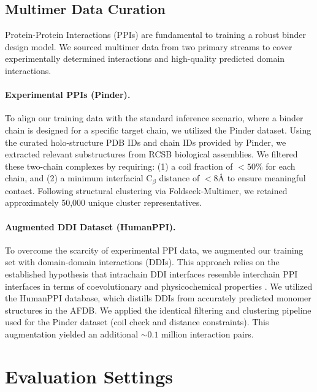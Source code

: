\subsection{Multimer Data Curation}
Protein-Protein Interactions (PPIs) are fundamental to training a robust binder design model. We sourced multimer data from two primary streams to cover experimentally determined interactions and high-quality predicted domain interactions.

\paragraph{Experimental PPIs (Pinder).} 
To align our training data with the standard inference scenario, where a binder chain is designed for a specific target chain, we utilized the Pinder dataset. Using the curated holo-structure PDB IDs and chain IDs provided by Pinder, we extracted relevant substructures from RCSB biological assemblies. We filtered these two-chain complexes by requiring: (1) a coil fraction of $< 50\%$ for each chain, and (2) a minimum interfacial C$_\beta$ distance of $< 8\text{\AA}$ to ensure meaningful contact. Following structural clustering via Foldseek-Multimer, we retained approximately 50,000 unique cluster representatives.

\paragraph{Augmented DDI Dataset (HumanPPI).} 
To overcome the scarcity of experimental PPI data, we augmented our training set with domain-domain interactions (DDIs). This approach relies on the established hypothesis that intrachain DDI interfaces resemble interchain PPI interfaces in terms of coevolutionary and physicochemical properties \cite{lau2024exploring}. We utilized the HumanPPI database, which distills DDIs from accurately predicted monomer structures in the AFDB. We applied the identical filtering and clustering pipeline used for the Pinder dataset (coil check and distance constraints). This augmentation yielded an additional $\sim 0.1$ million interaction pairs.




\section{Evaluation Settings}
\label{app:eval_settings}

